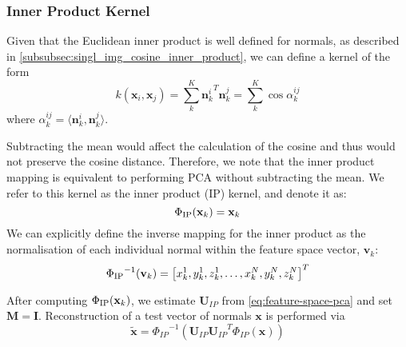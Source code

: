 \subsubsection{Inner Product Kernel}\label{subsubsec:sing_img_ip_kernel}
Given that the Euclidean inner product is well defined for normals, as 
described in \cref{subsubsec:singl_img_cosine_inner_product}, 
we can define a kernel of the form
\begin{equation}\label{eq:ip-cosine-kernel}
    k(\mathbf{x}_i, \mathbf{x}_j) = \sum^K_k {\mathbf{n}_k^i}^T \mathbf{n}_k^j = \sum^K_k \cos \alpha^{ij}_k
\end{equation}
where $\alpha^{ij}_k = \langle \mathbf{n}^i_k, \mathbf{n}^j_k \rangle$.

Subtracting the mean would affect the calculation of the cosine and thus would 
not preserve the cosine distance. Therefore, we note that the inner product 
mapping is equivalent to performing PCA without subtracting the mean. We refer 
to this kernel as the inner product (IP) kernel, and denote it as:
\begin{equation}\label{eq:ip-kernel}
    \Phi_{\operatorname{IP}} (\boldsymbol{\mathbf{x}}_k) = \mathbf{x}_k
\end{equation}
We can explicitly define the inverse mapping for the inner product as the 
normalisation of each individual normal within the feature space vector,
 $\mathbf{v}_k$:
\begin{equation}\label{eq:inv-ip-kernel}
    {\Phi_{\operatorname{IP}}}^{-1} (\boldsymbol{\mathbf{v}}_k) = \left[ x_k^1, y_k^1, z_k^1, \ldots, x_k^N, y_k^N, z_k^N \right]^T
\end{equation}

After computing $\Phi_{\operatorname{IP}} (\boldsymbol{\mathbf{x}}_k)$, we estimate $\mathbf{U}_{IP}$ from 
\cref{eq:feature-space-pca} and set $\mathbf{M} = \mathbf{I}$. 
Reconstruction of a test vector of normals $\mathbf{x}$ is performed via
\begin{equation}\label{eq:ip-reconstruction}
   \tilde{\mathbf{x}} = {\Phi_{IP}}^{-1} \left( \mathbf{U}_{IP} {\mathbf{U}_{IP}}^T \Phi_{IP}(\mathbf{x}) \right)
\end{equation}
